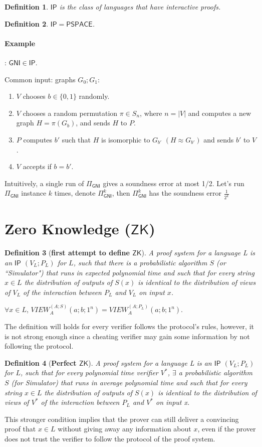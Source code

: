 \documentclass[11pt]{article}
\newcommand{\class}[1]{{\ensuremath{\mathsf{#1}}}}
\newcommand{\ip}{\class{IP}}
\newcommand{\zk}{\class{ZK}}
\newcommand{\gni}{\class{GNI}}
\newcommand{\zo}{\{0, 1\}}
\newtheorem{definition}{Definition}[section]
\begin{document}
\begin{definition}
$\ip$ is the class of languages that have interactive proofs.
\end{definition}
\begin{definition}
$\ip = \class{PSPACE}$.
\end{definition}

\paragraph{Example}: $\class{GNI} \in \ip$.

Common input: graphs $G_0; G_1$:
\begin{enumerate}
\item $V$ chooses $b\in \zo$ randomly.
\item $V$ chooses a random permutation $\pi\in S_n$, where $n = |V|$ and computes a new graph $H = \pi(G_{b})$, and sends $H$ to $P$.
\item $P$ computes $b'$ such that $H$ is isomorphic to $G_{b'}$ $(H \approx G_{b'})$ and sends $b'$ to $V$ .
\item $V$ accepts if $b = b'$.
\end{enumerate}
Intuitively, a single run of $\Pi_\gni$ gives a soundness error at most 1/2. Let's run $\Pi_\gni$ instance $k$ times, denote $\Pi_\gni^k$, then $\Pi_\gni^k$ has the soundness error $\frac{1}{2^k}$



\section{Zero Knowledge ($\zk$)}
\begin{definition}[\textbf{first attempt to define $\zk$}]
A proof system for a language L is an
$\ip$ $(V_L; P_L)$ for $L$, such that there is a probabilistic algorithm $S$ (or ``Simulator") that
runs in expected polynomial time and such that for every string $x\in L$ the distribution of outputs of
$S(x)$ is identical to the distribution of views of $V_L$ of the interaction between $P_L$ and $V_L$ on input $x$.
\end{definition}
$\forall x \in L$, $VIEW^{(A;S)}_A(a; b; 1^n) = VIEW^{(A;P_L)}_A (a; b; 1^n)$.

The definition will holds for every verifier follows the protocol's rules, however, it is not strong enough since a cheating verifier may gain some information by not following the protocol.

\begin{definition}[\textbf{Perfect $\zk$}]
A proof system for a language L is an $\ip$ $(V_L; P_L)$ for $L$, such that for every polynomial time verifier $V^*$, $\exists$ a probabilistic algorithm $S$ (for Simulator) that runs in average polynomial time and such that for every string $x \in L$ the distribution of outputs of $S(x)$ is identical to the distribution of views of $V^*$ of the interaction between $P_L$ and $V^*$ on input x.
\end{definition}
This stronger condition implies that the prover can still deliver a convincing proof that $x \in L$ without giving away any information about $x$, even if the prover does not trust the verifier to follow the protocol of the proof system.
\end{document}
